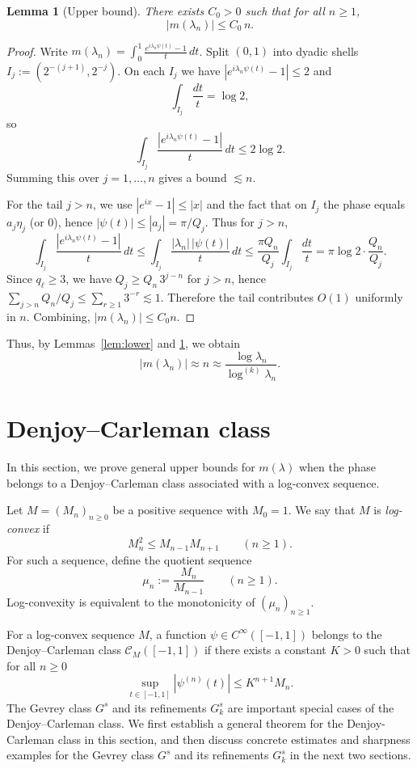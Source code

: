 \documentclass[11pt]{amsart}
\newtheorem{lemma}[theorem]{Lemma}
\newcommand{\la}{\lambda}
\newcommand{\ls}{\lesssim}
\newcommand{\1}{{\rm 1\hspace*{-0.4ex}%
			\rule{0.1ex}{1.52ex}\hspace*{0.2ex}}}
\newcommand{\CM}{\mathcal{C}_M}
\numberwithin{equation}{section}
\newcommand{\logit}[1]{\log^{(#1)}}
\begin{document}
\begin{lemma}[Upper bound]\label{lem:upper}
	There exists $C_0>0$ such that for all $n\ge 1$,
	\[
	|m(\lambda_n)|\le C_0\,n.
	\]
\end{lemma}

\begin{proof}
	Write $m(\lambda_n)=\int_0^1 \frac{e^{i\lambda_n\psi(t)}-1}{t}\,dt$.
	Split $(0,1)$ into dyadic shells $I_j:=(2^{-(j+1)},2^{-j})$.
	On each $I_j$ we have $|e^{i\lambda_n\psi(t)}-1|\le 2$ and
	\[
	\int_{I_j}\frac{dt}{t}=\log 2,
	\]
	so
	\[
	\int_{I_j}\frac{|e^{i\lambda_n\psi(t)}-1|}{t}\,dt \le 2\log 2.
	\]
	Summing this over $j=1,\dots,n$ gives a bound $\lesssim n$.
	
	For the tail $j>n$, we use $|e^{ix}-1|\le |x|$ and the fact that on $I_j$
	the phase equals $a_j\eta_j$ (or $0$), hence $|\psi(t)|\le |a_j|=\pi/Q_j$.
	Thus for $j>n$,
	\[
	\int_{I_j}\frac{|e^{i\lambda_n\psi(t)}-1|}{t}\,dt
	\le \int_{I_j}\frac{|\lambda_n|\,|\psi(t)|}{t}\,dt
	\le \frac{\pi Q_n}{Q_j}\int_{I_j}\frac{dt}{t}
	= \pi\log 2\cdot \frac{Q_n}{Q_j}.
	\]
	Since $q_\ell\ge 3$, we have $Q_j\ge Q_n\,3^{j-n}$ for $j>n$, hence
	$\sum_{j>n}Q_n/Q_j\le \sum_{r\ge 1}3^{-r}\ls 1$.
	Therefore the tail contributes $O(1)$ uniformly in $n$.
	Combining, $|m(\lambda_n)|\le C_0 n$.
\end{proof}


Thus, by Lemmas~\ref{lem:lower} and \ref{lem:upper}, we obtain
\[
|m(\lambda_n)|\approx n
\approx \frac{\log \lambda_n}{\logit{k}\lambda_n}.
\]

\section{Denjoy--Carleman class}\label{sec4}
In this section, we prove general upper bounds for $m(\la)$ when the phase belongs to a Denjoy--Carleman class associated with a log-convex sequence.

Let $M=(M_n)_{n\ge 0}$ be a positive sequence with $M_0=1$. We say that $M$ is \emph{log-convex} if
\[
M_n^2\le M_{n-1}M_{n+1}\qquad (n\ge 1).
\]
For such a sequence, define the quotient sequence
\[
\mu_n:=\frac{M_n}{M_{n-1}}\qquad (n\ge 1).
\]
Log-convexity is equivalent to the monotonicity of $(\mu_n)_{n\ge 1}$.


For a log-convex sequence $M$, a function $\psi\in C^\infty([-1,1])$ belongs to the Denjoy--Carleman class
$\CM([-1,1])$ if there exists a constant $K>0$ such that for all $n\ge0$
\begin{equation}\label{defdc}
	\sup_{t\in[-1,1]}|\psi^{(n)}(t)|\le K^{n+1}M_n.
\end{equation}
The Gevrey class $G^s$ and its refinements $G_k^s$ are important special cases of the Denjoy--Carleman class. We first establish a general theorem for the Denjoy-Carleman class in this section, and then discuss concrete estimates and sharpness examples for the Gevrey class $G^s$ and its refinements $G_k^s$ in the next two sections.
\end{document}
